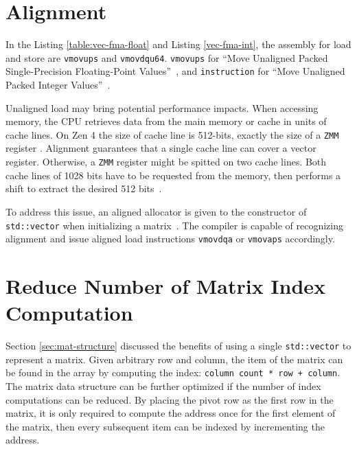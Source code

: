 \documentclass[logo,bsc,singlespacing,parskip]{infthesis}
\newcommand{\zmm}{\texttt{ZMM}}
\begin{document}
\section{Alignment}
In the Listing \ref{table:vec-fma-float} and Listing \ref{vec-fma-int}, the
assembly for load and store are \texttt{vmovups} and \texttt{vmovdqu64}. 
\texttt{vmovups} for
``Move Unaligned Packed Single-Precision Floating-Point Values''~\cite{instruction},
and \texttt{instruction} for 
``Move Unaligned Packed Integer Values''~\cite{vmovdqu64}. 

Unaligned load may bring potential performance impacts. When accessing memory,
the CPU retrieves data from the main memory or cache in units of cache lines. On
Zen 4 the size of cache line is 512-bits, exactly the size of a \zmm{} register
\cite{AMDManual}. Alignment guarantees that a single cache line can cover a
vector register. Otherwise, a \zmm{} register might be spitted on two cache lines.
Both cache lines of 1028 bits have to be requested from the memory, then
performs a shift to extract the desired 512 bits~\cite{Unaligned}.  

To address this issue, an aligned allocator is given to the constructor of
\texttt{std::vector} when initializing a matrix~\cite{FPL2}. 
 The compiler is capable of recognizing alignment
and issue aligned load instructions \texttt{vmovdqa} or \texttt{vmovaps}
accordingly. 

\section{Reduce Number of Matrix Index Computation}
\label{sec:optmz-get-index}

Section \ref{sec:mat-structure} discussed the benefits of using a single
\texttt{std::vector} to represent a matrix. Given arbitrary row and column, the
item of the matrix can be found in the array by computing the index:
\texttt{column count * row + column}. The matrix data structure can be further
optimized if the number of index computations can be reduced. By placing the
pivot row as the first row in the matrix, it is only required to compute the
address once for the first element of the matrix, then every subsequent item can
be indexed by incrementing the address. 

\end{document}
